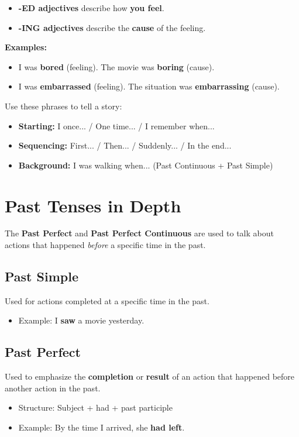 \begin{grammarbox}[title=-ED vs -ING Adjectives]
\begin{itemize}
    \item \textbf{-ED adjectives} describe how \textbf{you feel}.
    \item \textbf{-ING adjectives} describe the \textbf{cause} of the feeling.
\end{itemize}
\textbf{Examples:}
\begin{itemize}
    \item I was \textbf{bored} (feeling). The movie was \textbf{boring} (cause).
    \item I was \textbf{embarrassed} (feeling). The situation was \textbf{embarrassing} (cause).
\end{itemize}
\end{grammarbox}

\begin{grammarbox}[title=Narrating Past Events]
Use these phrases to tell a story:
\begin{itemize}
    \item \textbf{Starting:} I once... / One time... / I remember when...
    \item \textbf{Sequencing:} First... / Then... / Suddenly... / In the end...
    \item \textbf{Background:} I was walking when... (Past Continuous + Past Simple)
\end{itemize}
\end{grammarbox}

\section{Past Tenses in Depth}

The \textbf{Past Perfect} and \textbf{Past Perfect Continuous} are used to talk about actions that happened \textit{before} a specific time in the past.

\subsection{Past Simple}
Used for actions completed at a specific time in the past.
\begin{itemize}
    \item Example: I \textbf{saw} a movie yesterday.
\end{itemize}

\subsection{Past Perfect}
Used to emphasize the \textbf{completion} or \textbf{result} of an action that happened before another action in the past.
\begin{itemize}
    \item Structure: Subject + had + past participle
    \item Example: By the time I arrived, she \textbf{had left}.
\end{itemize}

